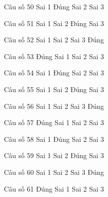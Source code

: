 \begin{ex}
Câu số 50
\choice
{Sai 1}
{\True Đúng}
{Sai 2}
{Sai 3}
\end{ex}

\begin{ex}
Câu số 51
\choice
{Sai 1}
{Sai 2}
{\True Đúng}
{Sai 3}
\end{ex}

\begin{ex}
Câu số 52
\choice
{Sai 1}
{Sai 2}
{Sai 3}
{\True Đúng}
\end{ex}
\begin{ex}
Câu số 53
\choice
{\True Đúng}
{Sai 1}
{Sai 2}
{Sai 3}
\end{ex}

\begin{ex}
Câu số 54
\choice
{Sai 1}
{\True Đúng}
{Sai 2}
{Sai 3}
\end{ex}

\begin{ex}
Câu số 55
\choice
{Sai 1}
{Sai 2}
{\True Đúng}
{Sai 3}
\end{ex}

\begin{ex}
Câu số 56
\choice
{Sai 1}
{Sai 2}
{Sai 3}
{\True Đúng}
\end{ex}
\begin{ex}
Câu số 57
\choice
{\True Đúng}
{Sai 1}
{Sai 2}
{Sai 3}
\end{ex}

\begin{ex}
Câu số 58
\choice
{Sai 1}
{\True Đúng}
{Sai 2}
{Sai 3}
\end{ex}

\begin{ex}
Câu số 59
\choice
{Sai 1}
{Sai 2}
{\True Đúng}
{Sai 3}
\end{ex}

\begin{ex}
Câu số 60
\choice
{Sai 1}
{Sai 2}
{Sai 3}
{\True Đúng}
\end{ex}
\begin{ex}
Câu số 61
\choice
{\True Đúng}
{Sai 1}
{Sai 2}
{Sai 3}
\end{ex}

